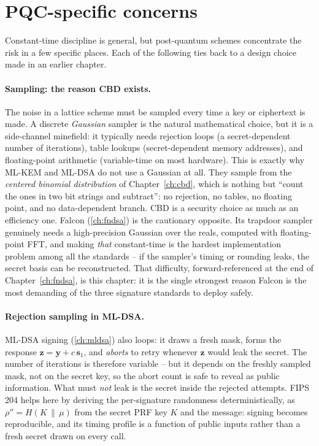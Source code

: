 \section{PQC-specific concerns}

Constant-time discipline is general, but post-quantum schemes concentrate the risk in
a few specific places. Each of the following ties back to a design choice made in an
earlier chapter.

\paragraph{Sampling: the reason CBD exists.}
The noise in a lattice scheme must be sampled every time a key or ciphertext is made.
A discrete \emph{Gaussian} sampler is the natural mathematical choice, but it is a
side-channel minefield: it typically needs rejection loops (a secret-dependent number
of iterations), table lookups (secret-dependent memory addresses), and floating-point
arithmetic (variable-time on most hardware). This is exactly why ML-KEM and ML-DSA do
not use a Gaussian at all. They sample from the \emph{centered binomial distribution}
of Chapter~\ref{ch:cbd}, which is nothing but ``count the ones in two bit strings and
subtract'': no rejection, no tables, no floating point, and no data-dependent branch.
CBD is a security choice as much as an efficiency one. Falcon (\ref{ch:fndsa}) is the
cautionary opposite. Its trapdoor sampler genuinely needs a high-precision Gaussian
over the reals, computed with floating-point FFT, and making \emph{that} constant-time
is the hardest implementation problem among all the standards -- if the sampler's
timing or rounding leaks, the secret basis can be reconstructed. That difficulty,
forward-referenced at the end of Chapter~\ref{ch:fndsa}, is this chapter: it is the
single strongest reason Falcon is the most demanding of the three signature standards
to deploy safely.

\paragraph{Rejection sampling in ML-DSA.}
ML-DSA signing (\ref{ch:mldsa}) also loops: it draws a fresh mask, forms the response
$\mathbf{z}=\mathbf{y}+c\,\mathbf{s}_1$, and \emph{aborts} to retry whenever
$\mathbf{z}$ would leak the secret. The number of iterations is therefore variable --
but it depends on the freshly sampled mask, not on the secret key, so the abort count
is safe to reveal as public information. What must \emph{not} leak is the secret
inside the rejected attempts. FIPS 204 helps here by deriving the per-signature
randomness deterministically, as $\rho'' = H(K\,\|\,\mu)$ from the secret PRF key $K$
and the message: signing becomes reproducible, and its timing profile is a function of
public inputs rather than a fresh secret drawn on every call.

